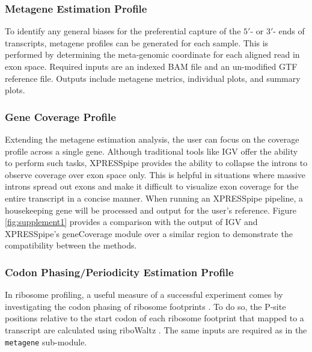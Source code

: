 \documentclass[10pt, oneside]{article}
\begin{document}
\subsubsection{Metagene Estimation Profile}
To identify any general biases for the preferential capture of the $5'$- or $3'$- ends of transcripts, metagene profiles can be generated for each sample. This is performed by determining the meta-genomic coordinate for each aligned read in exon space. Required inputs are an indexed BAM file and an un-modified GTF reference file. Outputs include metagene metrics, individual plots, and summary plots.

\subsubsection{Gene Coverage Profile}
Extending the metagene estimation analysis, the user can focus on the coverage profile across a single gene. Although traditional tools like IGV \cite{igv} offer the ability to perform such tasks, XPRESSpipe provides the ability to collapse the introns to observe coverage over exon space only. This is helpful in situations where massive introns spread out exons and make it difficult to visualize exon coverage for the entire transcript in a concise manner. When running an XPRESSpipe pipeline, a housekeeping gene will be processed and output for the user's reference. Figure \ref{fig:supplement1} provides a comparison with the output of IGV \cite{igv} and XPRESSpipe's geneCoverage module over a similar region to demonstrate the compatibility between the methods.

\subsubsection{Codon Phasing/Periodicity Estimation Profile}
In ribosome profiling, a useful measure of a successful experiment comes by investigating the codon phasing of ribosome footprints \cite{ingolia_meth}. To do so, the P-site positions relative to the start codon of each ribosome footprint that mapped to a transcript are calculated using riboWaltz \cite{ribowaltz}. The same inputs are required as in the \texttt{metagene} sub-module.
\end{document}

